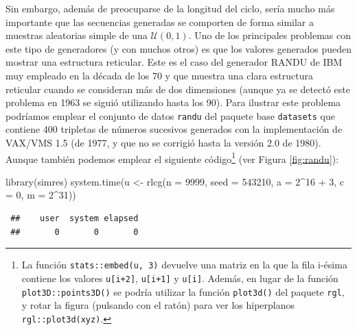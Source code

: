 \documentclass[
]{book}
\newenvironment{Shaded}{\begin{snugshade}}{\end{snugshade}}
\newcommand{\AttributeTok}[1]{\textcolor[rgb]{0.77,0.63,0.00}{#1}}
\newcommand{\DecValTok}[1]{\textcolor[rgb]{0.00,0.00,0.81}{#1}}
\newcommand{\FunctionTok}[1]{\textcolor[rgb]{0.00,0.00,0.00}{#1}}
\newcommand{\NormalTok}[1]{#1}
\newcommand{\OtherTok}[1]{\textcolor[rgb]{0.56,0.35,0.01}{#1}}
\newcommand{\SpecialCharTok}[1]{\textcolor[rgb]{0.00,0.00,0.00}{#1}}
\theoremstyle{break}
\theoremstyle{nonumberplain}
\begin{document}
Sin embargo, además de preocuparse de la longitud del ciclo, sería mucho más importante que las secuencias generadas se comporten de forma similar a muestras aleatorias simple de una \(\mathcal{U}(0,1)\).
Uno de los principales problemas con este tipo de generadores (y con muchos otros) es que los valores generados pueden mostrar una estructura reticular.
Este es el caso del generador RANDU de IBM muy empleado en la década de los 70 y que muestra una clara estructura reticular cuando se consideran más de dos dimensiones (aunque ya se detectó este problema en 1963 se siguió utilizando hasta los 90).
Para ilustrar este problema podríamos emplear el conjunto de datos \texttt{randu} del paquete base \texttt{datasets} que contiene 400 tripletas de números sucesivos generados con la implementación de VAX/VMS 1.5 (de 1977, y que no se corrigió hasta la versión 2.0 de 1980).
Aunque también podemos emplear el siguiente código\footnote{La función \texttt{stats::embed(u,\ 3)} devuelve una matriz en la que la fila i-ésima contiene los valores \texttt{u{[}i+2{]}}, \texttt{u{[}i+1{]}} y \texttt{u{[}i{]}}. Además, en lugar de la función \texttt{plot3D::points3D()} se podría utilizar la función \texttt{plot3d()} del paquete \texttt{rgl}, y rotar la figura (pulsando con el ratón) para ver los hiperplanos \texttt{rgl::plot3d(xyz)}.} (ver Figura \ref{fig:randu}):

\begin{Shaded}
\begin{Highlighting}[]
\FunctionTok{library}\NormalTok{(simres)}
\FunctionTok{system.time}\NormalTok{(u }\OtherTok{\textless{}{-}} \FunctionTok{rlcg}\NormalTok{(}\AttributeTok{n =} \DecValTok{9999}\NormalTok{, }
          \AttributeTok{seed =} \DecValTok{543210}\NormalTok{, }\AttributeTok{a =} \DecValTok{2}\SpecialCharTok{\^{}}\DecValTok{16} \SpecialCharTok{+} \DecValTok{3}\NormalTok{, }\AttributeTok{c =} \DecValTok{0}\NormalTok{, }\AttributeTok{m =} \DecValTok{2}\SpecialCharTok{\^{}}\DecValTok{31}\NormalTok{))}
\end{Highlighting}
\end{Shaded}

\begin{verbatim}
 ##    user  system elapsed 
 ##       0       0       0
\end{verbatim}
\end{document}
